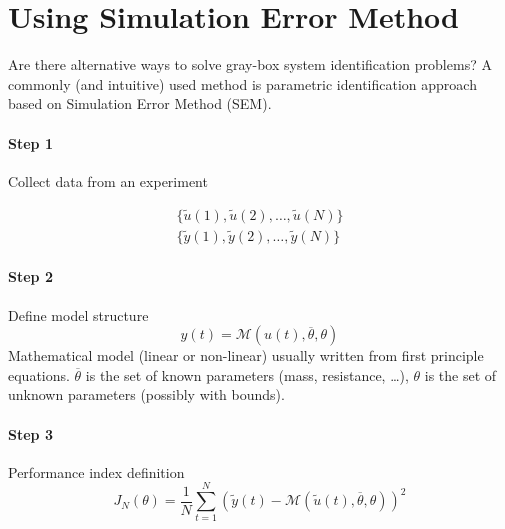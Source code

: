 
\section{Using Simulation Error Method}

Are there alternative ways to solve gray-box system identification problems?
A commonly (and intuitive) used method is parametric identification approach based on Simulation Error Method (SEM).

\begin{figure}[H]
    \centering
\end{figure}

\paragraph{Step 1} Collect data from an experiment

\begin{align*}
    \{ \tilde{u}(1), \tilde{u}(2), \dots, \tilde{u}(N) \} \\
    \{ \tilde{y}(1), \tilde{y}(2), \dots, \tilde{y}(N) \}
\end{align*}

\paragraph{Step 2} Define model structure
\[
    y(t) = \mathcal{M}(u(t), \overline{\theta}, \theta)
\]
Mathematical model (linear or non-linear) usually written from first principle equations. $\overline{\theta}$ is the set of known parameters (mass, resistance, \dots), $\theta$ is the set of unknown parameters (possibly with bounds).

\paragraph{Step 3} Performance index definition
\[
    J_N(\theta) = \frac{1}{N} \sum_{t=1}^N \left( \tilde{y}(t) - \mathcal{M}(\tilde{u}(t), \overline{\theta}, \theta) \right)^2
\]

